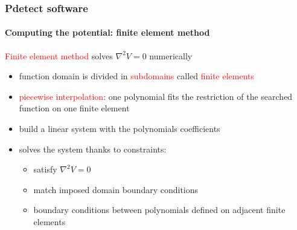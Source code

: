 \documentclass[14pt]{beamer}
\begin{document}
\begin{frame}
  \frametitle{Pdetect software}
  \framesubtitle{Computing the potential: finite element method}

  \fontsize{12pt}{7.2}\selectfont


\textcolor{red}{Finite element method} solves $\nabla^2 V = 0$
numerically

\begin{itemize}
    \setlength\itemsep{1em}
  \item function domain is divided in \textcolor{red}{subdomains} called \textcolor{red}{finite elements}
  \item \textcolor{red}{piecewise interpolation}: one polynomial fits the restriction
  of the searched function on one finite element
  \item build a linear system with the polynomials coefficients
  \item solves the system thanks to constraints:
  \begin{itemize}
    \item satisfy $\nabla^2 V = 0$
    \item match imposed domain boundary conditions
    \item boundary conditions between polynomials defined on adjacent finite
    elements
    \end{itemize}
\end{itemize}

\end{frame}
\end{document}
